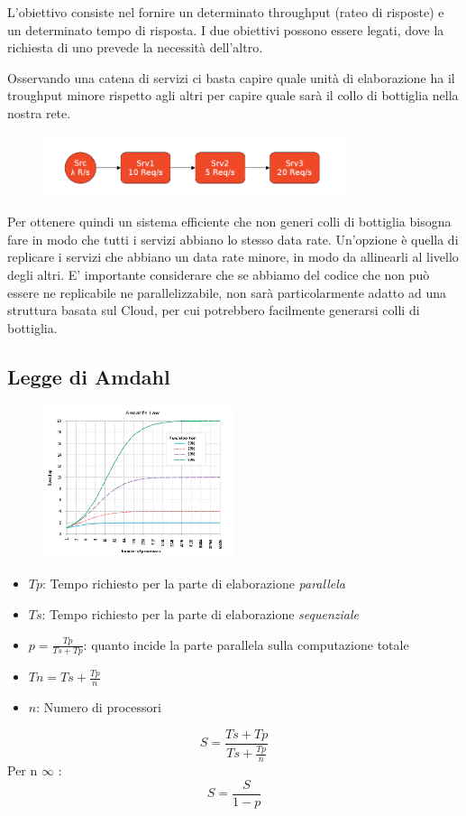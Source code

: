 \documentclass{article}
\begin{document}
		L'obiettivo consiste nel fornire un determinato throughput  (rateo di risposte) e un determinato tempo di risposta. I due obiettivi possono essere legati, dove la richiesta di uno prevede la necessità dell'altro.
		
		Osservando una catena di servizi ci basta capire quale unità di elaborazione ha il troughput minore rispetto agli altri per capire quale sarà il collo di bottiglia nella nostra rete.
		\begin{figure}[h]
		\centering
		\includegraphics[width=0.8\textwidth]{SAC_02.png}
		\end{figure}
		Per ottenere quindi un sistema efficiente che non generi colli di bottiglia bisogna fare in modo che tutti i servizi abbiano lo stesso data rate. Un'opzione è quella di replicare i servizi che abbiano un data rate minore, in modo da allinearli al livello degli altri.
		E' importante considerare che se abbiamo del codice che non può essere ne replicabile ne parallelizzabile, non sarà particolarmente adatto  ad una struttura basata sul Cloud, per cui potrebbero facilmente generarsi colli di bottiglia.
		
		\subsection{Legge di Amdahl}
		\begin{figure}[ht]
			\centering
			\includegraphics[width=0.5\textwidth]{SAC_03.png}
		\end{figure}
		
		\begin{itemize}
		    \item $Tp$: Tempo richiesto per la parte di elaborazione \emph{parallela}
		    \item $Ts$: Tempo richiesto per la parte di elaborazione \emph{sequenziale}
		    \item $p=\frac{Tp}{Ts+Tp}$: quanto incide la parte parallela sulla computazione totale
		    \item $Tn=Ts+\frac{Tp}{n}$
		    \item $n$: Numero di processori
		\end{itemize}
		\[S=\frac{Ts+Tp}{Ts+\frac{Tp}{n}}\]
		Per n \textrightarrow $\infty$ : \[S=\frac{S}{1-p}\]
		
\end{document}
